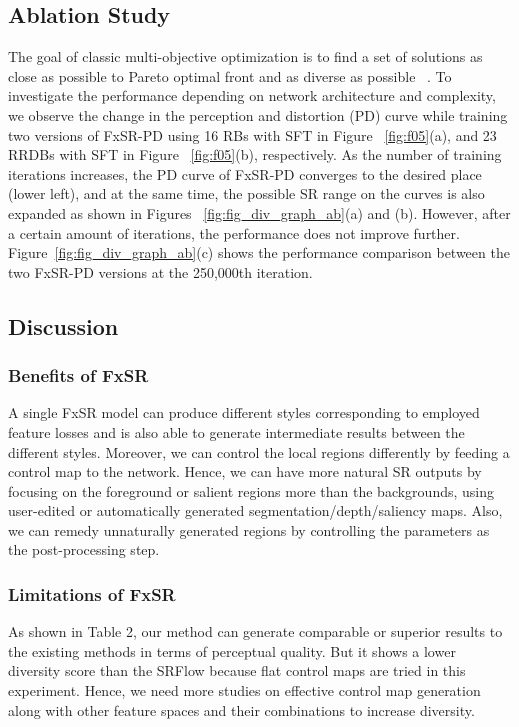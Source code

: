 \documentclass{article}
\begin{document}
\subsection{Ablation Study}
The goal of classic multi-objective optimization is to find a set of solutions as close as possible to Pareto optimal front and as diverse as possible ~\cite{deb2011multi,lin2019pareto}.
To investigate the performance depending on network architecture and complexity, we observe the change in the perception and distortion (PD) curve while training two versions of FxSR-PD using 16 RBs with SFT in Figure ~\ref{fig:f05}(a), and 23 RRDBs with SFT in Figure ~\ref{fig:f05}(b), respectively. As the number of training iterations increases, the PD curve of FxSR-PD converges to the desired place (lower left), and at the same time, the possible SR range on the curves is also expanded as shown in Figures ~\ref{fig:fig_div_graph_ab}(a) and (b). However, after a certain amount of iterations, the performance does not improve further. Figure~\ref{fig:fig_div_graph_ab}(c) shows the performance comparison between the two FxSR-PD versions at the 250,000th iteration.

\subsection{Discussion}
\subsubsection{Benefits of FxSR}
A single FxSR model can produce different styles corresponding to employed feature losses and is also able to generate intermediate results between the different styles. Moreover, we can control the local regions differently by feeding a control map to the network. Hence, we can have more natural SR outputs by focusing on the foreground or salient regions more than the backgrounds, using user-edited or automatically generated segmentation/depth/saliency maps. Also, we can remedy unnaturally generated regions by controlling the parameters as the post-processing step.

\subsubsection{Limitations of FxSR}
As shown in Table 2, our method can generate comparable or superior results to the existing methods in terms of perceptual quality. But it shows a lower diversity score than the SRFlow because flat control maps are tried in this experiment. Hence, we need more studies on effective control map generation along with other feature spaces and their combinations to increase diversity.
\end{document}
